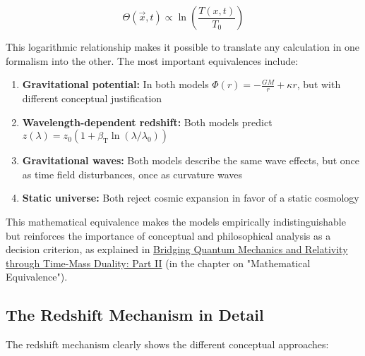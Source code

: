 \documentclass[12pt,a4paper]{article}
\newcommand{\Tfieldt}{T(x,t)}
\newcommand{\betaT}{\beta_{\text{T}}}
\newcommand{\Tzero}{T_0}
\newcommand{\vecx}{\vec{x}}
\begin{document}
	\begin{equation}
		\Theta(\vecx,t) \propto \ln\left(\frac{\Tfieldt}{\Tzero}\right)
	\end{equation}
	
	This logarithmic relationship makes it possible to translate any calculation in one formalism into the other. The most important equivalences include:
	
	\begin{enumerate}
		\item \textbf{Gravitational potential:} In both models $\Phi(r) = -\frac{GM}{r} + \kappa r$, but with different conceptual justification
		
		\item \textbf{Wavelength-dependent redshift:} Both models predict $z(\lambda) = z_0 (1 + \betaT \ln(\lambda/\lambda_0))$
		
		\item \textbf{Gravitational waves:} Both models describe the same wave effects, but once as time field disturbances, once as curvature waves
		
		\item \textbf{Static universe:} Both reject cosmic expansion in favor of a static cosmology
	\end{enumerate}
	
	This mathematical equivalence makes the models empirically indistinguishable but reinforces the importance of conceptual and philosophical analysis as a decision criterion, as explained in \href{https://github.com/jpascher/T0-Time-Mass-Duality/tree/main/2/pdf/English/QMRelTimeMassPart2En.pdf}{Bridging Quantum Mechanics and Relativity through Time-Mass Duality: Part II} (in the chapter on "Mathematical Equivalence").
	
	\subsection{The Redshift Mechanism in Detail}
	\label{subsec:redshift_mechanism_detail}
	
	The redshift mechanism clearly shows the different conceptual approaches:
	
\end{document}
